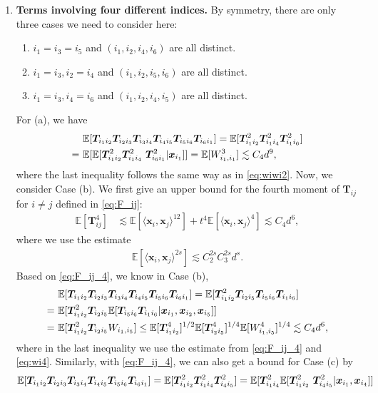 \documentclass[twoside,11pt]{article}
\newcommand{\E}{\mathbb{E}}
\def\bx{{\boldsymbol x}}
\def\T{{\mathbb T}}
\def\T{{\mathbb T}}
\renewcommand{\T}{\boldsymbol{T}}
\newcommand{\1}{\mathbf{1}}
\begin{document}
\begin{enumerate}[label=\textbf{Case (\roman*).},leftmargin=0ex, itemindent=12ex]
\item \textbf{Terms involving four different indices.} By symmetry, there are only three cases we need to consider here: 
\begin{enumerate}[label=(\alph*)]
    \item $i_1=i_3=i_5$ and $(i_1,i_2,i_4,i_6)$ are all distinct.
    \item $i_1=i_3,i_2=i_4$ and $(i_1,i_2,i_5,i_6)$ are all distinct.
    \item $i_1=i_3,i_4=i_6$ and $(i_1,i_2,i_4,i_5)$ are all distinct.
\end{enumerate} 
For (a), we have 
\begin{align}
&\E[\T_{i_1i_2}\T_{i_2i_3}\T_{i_3i_4}\T_{i_4i_5}\T_{i_5i_6}\T_{i_6i_1}]=\E[\T_{i_1i_2}^2\T_{i_1i_4}^2\T_{i_1i_6}^2] \notag \\
    =~ & \E[\E[\T_{i_1i_2}^2 \T_{i_1i_4}^2\ \T_{i_6i_1}^2| \bx_{i_1} ]] 
    =  \E[W_{i_1,i_1}^3]
    \lesssim  C_4 d^9, \label{eq:four_distinct_1}
\end{align}
where the last inequality follows the same way as in \eqref{eq:wiwi2}. Now, we consider Case (b).  We first give an upper bound for the fourth moment of $\T_{ij}$ for $i\not=j$ defined in \eqref{eq:F_ij}: 
\begin{align}
    \E[\T_{ij}^4]&\lesssim \E[\langle \bx_i,\bx_j\rangle^{12}]+t^4\E [\langle \bx_i,\bx_j\rangle^4]
    \lesssim  C_4d^{6},\label{eq:F_ij_4}
\end{align}
where we use the estimate  \begin{align}\label{eq:y_moment}
    \E[\langle \bx_i,\bx_j\rangle^{2s}]\lesssim C_2^{2s} C_3^{2s} d^s.
\end{align}
Based on \eqref{eq:F_ij_4}, we know in Case (b),
\begin{align}
&\E[\T_{i_1i_2}\T_{i_2i_3}\T_{i_3i_4}\T_{i_4i_5}\T_{i_5i_6}\T_{i_6i_1}]=\E[\T_{i_1i_2}^2\T_{i_2i_5}\T_{i_5i_6}\T_{i_1i_6}] \notag \\
    =~ & \E[\T_{i_1i_2}^2\T_{i_2i_5}\E[\T_{i_5i_6}\T_{i_1i_6}| \bx_{i_1},\bx_{i_2}, \bx_{i_5} ]] \notag \\
    =~& \E[\T_{i_1i_2}^2\T_{i_2i_5}W_{i_1,i_5}]\le \E[\T_{i_1i_2}^4]^{1/2}\E[\T_{i_2i_5}^4]^{1/4}\E[W_{i_1,i_5}^4]^{1/4}\lesssim C_4 d^6,\label{eq:four_distinct_2}
\end{align}
where in the last inequality we use the estimate from \eqref{eq:F_ij_4} and \eqref{eq:wi4}. Similarly, with \eqref{eq:F_ij_4}, we can also get a bound for Case (c) by  
\begin{align}
&\E[\T_{i_1i_2}\T_{i_2i_3}\T_{i_3i_4}\T_{i_4i_5}\T_{i_5i_6}\T_{i_6i_1}]=\E[\T_{i_1i_2}^2\T_{i_1i_4}^2\T_{i_4i_5}^2] = \E[\T_{i_1i_4}^2\E[\T_{i_1i_2}^2 \ \T_{i_4i_5}^2| \bx_{i_1},\bx_{i_4} ]] \notag \\

\end{align}
\end{enumerate}
\end{document}
